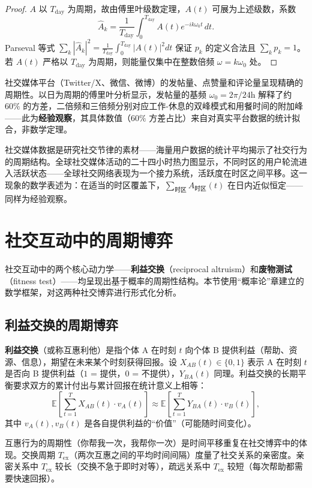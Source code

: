 \begin{proof}
$A$ 以 $T_{\text{day}}$ 为周期，故由傅里叶级数定理，$A(t)$ 可展为上述级数，系数
\[
\hat{A}_k = \frac{1}{T_{\text{day}}}\int_0^{T_{\text{day}}} A(t)e^{-ik\omega_0 t}\,dt.
\]
Parseval 等式 $\sum_{k}|\hat{A}_k|^2 = \frac{1}{T_{\text{day}}}\int_0^{T_{\text{day}}}|A(t)|^2 dt$ 保证 $p_k$ 的定义合法且 $\sum_k p_k = 1$。若 $A(t)$ 严格以 $T_{\text{day}}$ 为周期，则能量仅集中在整数倍频 $\omega = k\omega_0$ 处。
\end{proof}

\begin{remark}\label{prop:social_media_rhythm}
社交媒体平台（Twitter/X、微信、微博）的发帖量、点赞量和评论量呈现精确的周期性。以日为周期的傅里叶分析显示，发帖量的基频 $\omega_0 = 2\pi/24\text{h}$ 解释了约 $60\%$ 的方差，二倍频和三倍频分别对应工作-休息的双峰模式和用餐时间的附加峰——此为\textbf{经验观察}，其具体数值（$60\%$ 方差占比）来自对真实平台数据的统计拟合，非数学定理。

社交媒体数据是研究社交节律的素材——海量用户数据的统计平均揭示了社交行为的周期结构。全球社交媒体活动的二十四小时热力图显示，不同时区的用户轮流进入活跃状态——全球社交网络表现为一个接力系统，活跃度在时区之间平移。这一现象的数学表述为：在适当的时区覆盖下，$\sum_{\text{时区}} A_{\text{时区}}(t)$ 在日内近似恒定——同样为经验观察。
\end{remark}

\section{社交互动中的周期博弈}

社交互动中的两个核心动力学——\textbf{利益交换}（reciprocal altruism）和\textbf{废物测试}（fitness test）——均呈现出基于概率的周期性结构。本节使用“概率论”章建立的数学框架，对这两种社交博弈进行形式化分析。

\subsection{利益交换的周期博弈}

\begin{definition}[利益交换的周期模型]\label{def:reciprocal_altruism}
\textbf{利益交换}（或称互惠利他）是指个体 A 在时刻 $t$ 向个体 B 提供利益（帮助、资源、信息），期望在未来某个时刻获得回报。设 $X_{AB}(t) \in \{0,1\}$ 表示 A 在时刻 $t$ 是否向 B 提供利益（$1$ = 提供，$0$ = 不提供），$Y_{BA}(t)$ 同理。利益交换的长期平衡要求双方的累计付出与累计回报在统计意义上相等：
\[
\mathbb{E}\left[\sum_{t=1}^{T} X_{AB}(t) \cdot v_A(t)\right] \approx \mathbb{E}\left[\sum_{t=1}^{T} Y_{BA}(t) \cdot v_B(t)\right],
\]
其中 $v_A(t), v_B(t)$ 是各自提供利益的“价值”（可能随时间变化）。

互惠行为的周期性（你帮我一次，我帮你一次）是时间平移重复在社交博弈中的体现。交换周期 $T_{\text{ex}}$（两次互惠之间的平均时间间隔）度量了社交关系的亲密度。亲密关系中 $T_{\text{ex}}$ 较长（交换不急于即时对等），疏远关系中 $T_{\text{ex}}$ 较短（每次帮助都需要快速回报）。
\end{definition}

